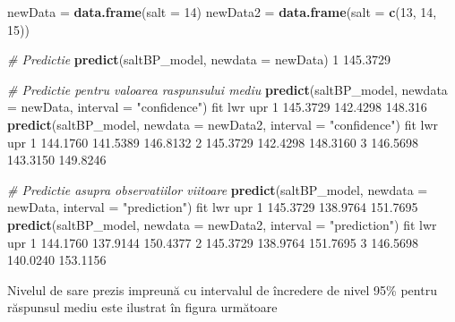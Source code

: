 \documentclass[]{article}
\newenvironment{Shaded}{\begin{snugshade}}{\end{snugshade}}
\newcommand{\KeywordTok}[1]{\textcolor[rgb]{0.13,0.29,0.53}{\textbf{#1}}}
\newcommand{\DataTypeTok}[1]{\textcolor[rgb]{0.13,0.29,0.53}{#1}}
\newcommand{\DecValTok}[1]{\textcolor[rgb]{0.00,0.00,0.81}{#1}}
\newcommand{\FloatTok}[1]{\textcolor[rgb]{0.00,0.00,0.81}{#1}}
\newcommand{\StringTok}[1]{\textcolor[rgb]{0.31,0.60,0.02}{#1}}
\newcommand{\CommentTok}[1]{\textcolor[rgb]{0.56,0.35,0.01}{\textit{#1}}}
\newcommand{\NormalTok}[1]{#1}
\begin{document}
\begin{Shaded}
\begin{Highlighting}[]
\NormalTok{newData =}\StringTok{ }\KeywordTok{data.frame}\NormalTok{(}\DataTypeTok{salt =} \DecValTok{14}\NormalTok{)}
\NormalTok{newData2 =}\StringTok{ }\KeywordTok{data.frame}\NormalTok{(}\DataTypeTok{salt =} \KeywordTok{c}\NormalTok{(}\DecValTok{13}\NormalTok{, }\DecValTok{14}\NormalTok{, }\DecValTok{15}\NormalTok{))}

\CommentTok{# Predictie}
\KeywordTok{predict}\NormalTok{(saltBP_model, }\DataTypeTok{newdata =}\NormalTok{ newData)}
       \DecValTok{1} 
\FloatTok{145.3729} 

\CommentTok{# Predictie pentru valoarea raspunsului mediu}
\KeywordTok{predict}\NormalTok{(saltBP_model, }\DataTypeTok{newdata =}\NormalTok{ newData, }\DataTypeTok{interval =} \StringTok{"confidence"}\NormalTok{)}
\NormalTok{       fit      lwr     upr}
\DecValTok{1} \FloatTok{145.3729} \FloatTok{142.4298} \FloatTok{148.316}
\KeywordTok{predict}\NormalTok{(saltBP_model, }\DataTypeTok{newdata =}\NormalTok{ newData2, }\DataTypeTok{interval =} \StringTok{"confidence"}\NormalTok{)}
\NormalTok{       fit      lwr      upr}
\DecValTok{1} \FloatTok{144.1760} \FloatTok{141.5389} \FloatTok{146.8132}
\DecValTok{2} \FloatTok{145.3729} \FloatTok{142.4298} \FloatTok{148.3160}
\DecValTok{3} \FloatTok{146.5698} \FloatTok{143.3150} \FloatTok{149.8246}

\CommentTok{# Predictie asupra observatiilor viitoare}
\KeywordTok{predict}\NormalTok{(saltBP_model, }\DataTypeTok{newdata =}\NormalTok{ newData, }\DataTypeTok{interval =} \StringTok{"prediction"}\NormalTok{)}
\NormalTok{       fit      lwr      upr}
\DecValTok{1} \FloatTok{145.3729} \FloatTok{138.9764} \FloatTok{151.7695}
\KeywordTok{predict}\NormalTok{(saltBP_model, }\DataTypeTok{newdata =}\NormalTok{ newData2, }\DataTypeTok{interval =} \StringTok{"prediction"}\NormalTok{)}
\NormalTok{       fit      lwr      upr}
\DecValTok{1} \FloatTok{144.1760} \FloatTok{137.9144} \FloatTok{150.4377}
\DecValTok{2} \FloatTok{145.3729} \FloatTok{138.9764} \FloatTok{151.7695}
\DecValTok{3} \FloatTok{146.5698} \FloatTok{140.0240} \FloatTok{153.1156}
\end{Highlighting}
\end{Shaded}

Nivelul de sare prezis impreună cu intervalul de încredere de nivel 95\%
pentru răspunsul mediu este ilustrat în figura următoare
\end{document}
